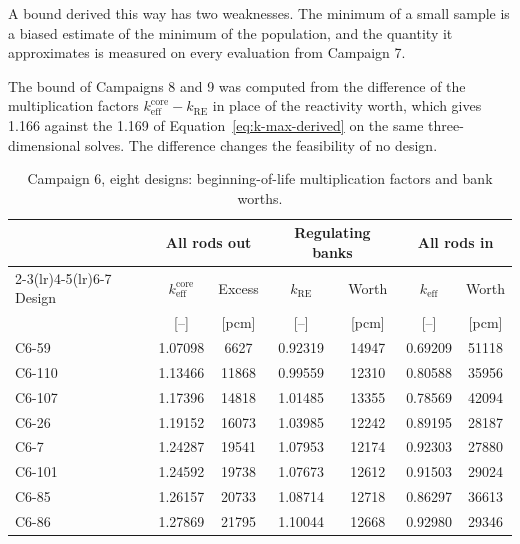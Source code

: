 A bound derived this way has two weaknesses. The minimum of a small
sample is a biased estimate of the minimum of the population, and the quantity it approximates is measured on every evaluation from Campaign
7.

The bound of Campaigns 8 and 9 was computed from the difference of the multiplication factors $k_\mathrm{eff}^\mathrm{core} - k_\mathrm{RE}$ in place of
the reactivity worth, which gives 1.166 against the 1.169 of
Equation~\eqref{eq:k-max-derived} on the same three-dimensional solves.
The difference changes the feasibility of no design.

\begin{table}[!htb]
  \centering
  \small
  \caption{Campaign 6, eight designs: beginning-of-life multiplication factors and bank worths.}
  \label{tab:c6-kmax}
  \begin{tabular}{lcccccc}
    \toprule
    & \multicolumn{2}{c}{All rods out} & \multicolumn{2}{c}{Regulating banks} & \multicolumn{2}{c}{All rods in} \\
    \cmidrule(lr){2-3}\cmidrule(lr){4-5}\cmidrule(lr){6-7}
    Design & $k_\mathrm{eff}^\mathrm{core}$ & Excess & $k_\mathrm{RE}$ & Worth & $k_\mathrm{eff}$ & Worth \\
    & [--] & [pcm] & [--] & [pcm] & [--] & [pcm] \\
    \midrule
    C6-59  & 1.07098 & \num{6627}  & 0.92319 & \num{14947} & 0.69209 & \num{51118} \\
    C6-110 & 1.13466 & \num{11868} & 0.99559 & \num{12310} & 0.80588 & \num{35956} \\
    C6-107 & 1.17396 & \num{14818} & 1.01485 & \num{13355} & 0.78569 & \num{42094} \\
    C6-26  & 1.19152 & \num{16073} & 1.03985 & \num{12242} & 0.89195 & \num{28187} \\
    C6-7   & 1.24287 & \num{19541} & 1.07953 & \num{12174} & 0.92303 & \num{27880} \\
    C6-101 & 1.24592 & \num{19738} & 1.07673 & \num{12612} & 0.91503 & \num{29024} \\
    C6-85  & 1.26157 & \num{20733} & 1.08714 & \num{12718} & 0.86297 & \num{36613} \\
    C6-86  & 1.27869 & \num{21795} & 1.10044 & \num{12668} & 0.92980 & \num{29346} \\
    \bottomrule
  \end{tabular}
\end{table}

\label{sec:res-c6-kmax}

